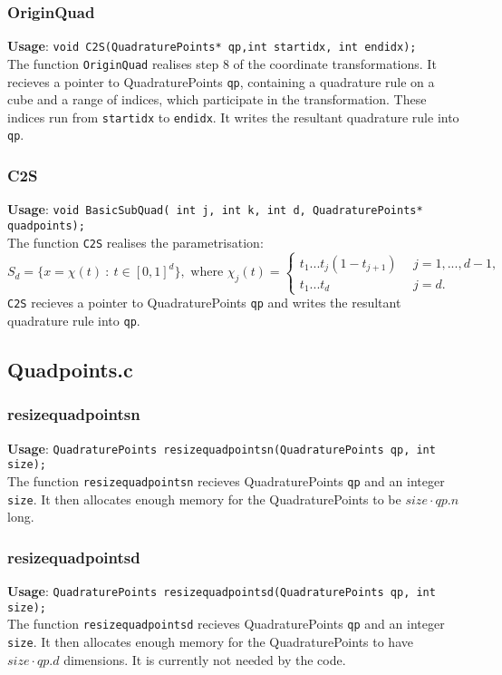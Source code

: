 \documentclass[a4paper,10pt]{article}
\begin{document}
\subsubsection{OriginQuad}
\textbf{Usage}: \verb=void C2S(QuadraturePoints* qp,int startidx, int endidx);=\\
The function \verb=OriginQuad= realises step 8 of the coordinate transformations. It recieves a pointer 
to QuadraturePoints \verb=qp=, containing a quadrature rule on a cube and a range of indices, which 
participate in the transformation. These indices run from \verb=startidx= to \verb=endidx=. It writes 
the resultant quadrature rule into \verb=qp=.
\subsubsection{C2S}
\textbf{Usage}: \verb=void BasicSubQuad( int j, int k, int d, QuadraturePoints* quadpoints);=\\
The function \verb=C2S= realises the parametrisation: 
\begin{displaymath}
  S_d=\{x=\chi(t)~:~t\in [0,1]^d\},\text{ where }\chi_j(t)=\begin{cases}t_1...t_j(1-t_{j+1})~~&j=1,...,d-1,\\
                                                                t_1...t_d&j=d.\end{cases}
\end{displaymath}
\verb=C2S= recieves a pointer to QuadraturePoints \verb=qp= and writes the resultant quadrature rule into 
\verb=qp=.

\subsection{Quadpoints.c}
\subsubsection{resizequadpointsn}
\textbf{Usage}: \verb=QuadraturePoints resizequadpointsn(QuadraturePoints qp, int size);=\\
The function \verb=resizequadpointsn= recieves QuadraturePoints \verb=qp= and an integer \verb=size=. 
It then allocates enough memory for the QuadraturePoints to be $size\cdot qp.n$ long.
\subsubsection{resizequadpointsd}
\textbf{Usage}: \verb=QuadraturePoints resizequadpointsd(QuadraturePoints qp, int size);=\\
The function \verb=resizequadpointsd= recieves QuadraturePoints \verb=qp= and an integer \verb=size=. 
It then allocates enough memory for the QuadraturePoints to have $size\cdot qp.d$ dimensions.
It is currently not needed by the code.
\end{document}
